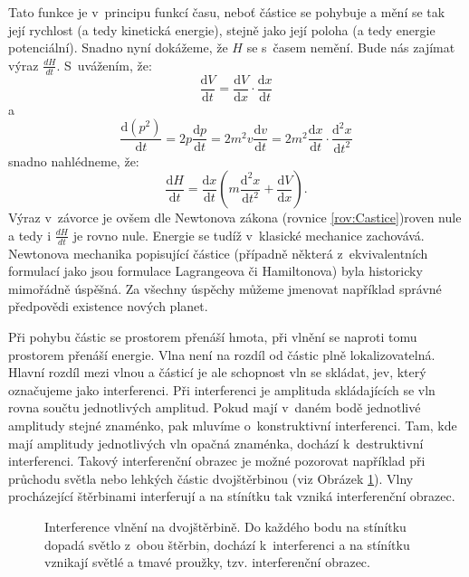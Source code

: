 Tato funkce je v~principu funkcí času, neboť částice se pohybuje a mění se tak její rychlost (a tedy kinetická energie), stejně jako její poloha (a tedy energie potenciální). Snadno nyní dokážeme, že $H$ se s~časem nemění. Bude nás zajímat výraz $\frac {dH}{dt}$. S~uvážením, že:
\begin{equation}
\frac{\mathrm{d}V}{\mathrm{d}t} = \frac{\mathrm{d}V}{\mathrm{d}x}\cdot \frac{\mathrm{d}x}{\mathrm{d}t}\mbox{}
\label{rov:Castice2}
\end{equation}
a
\begin{equation}
\frac{\mathrm{d} (p^2)}{\mathrm{d}t}=2p\frac{\mathrm{d}p}{\mathrm{d}t}=2m^2v\frac{\mathrm{d}v}{\mathrm{d}t}=2m^2\frac{\mathrm{d}x}{\mathrm{d}t}\cdot\frac{\mathrm{d}^2x}{\mathrm{d}t^2}\mbox{}
\label{rov:Castice3}
\end{equation}
snadno nahlédneme, že:
\begin{equation}
\frac{\mathrm{d}H}{\mathrm{d}t}=\frac{\mathrm{d}x}{\mathrm{d}t}\left ( m\frac{\mathrm{d}^2x}{\mathrm{d}t^2}+\frac{\mathrm{d}V}{\mathrm{d}x}\right )\mbox{.}
\label{rov:Castice4}
\end{equation}
Výraz v~závorce je ovšem dle Newtonova zákona (rovnice \ref{rov:Castice})roven nule a tedy i $\frac{dH}{dt}$ je rovno nule. Energie se tudíž v~klasické mechanice zachovává.
Newtonova mechanika popisující částice (případně některá z~ekvivalentních formulací jako jsou formulace Lagrangeova či Hamiltonova) byla historicky mimořádně úspěšná. Za všechny úspěchy můžeme jmenovat například správné předpovědi existence nových planet. 

Při pohybu částic se prostorem přenáší hmota, při vlnění se naproti tomu prostorem přenáší energie. Vlna není na rozdíl od částic plně lokalizovatelná. Hlavní rozdíl mezi vlnou a částicí je ale schopnost vln se skládat, jev, který označujeme jako interferenci. Při interferenci je amplituda skládajících se vln rovna součtu jednotlivých amplitud. Pokud mají v~daném bodě jednotlivé amplitudy stejné znaménko, pak mluvíme o~konstruktivní interferenci. Tam, kde mají amplitudy jednotlivých vln opačná znaménka, dochází k~destruktivní interferenci. Takový interferenční obrazec je možné pozorovat například při průchodu světla nebo lehkých částic dvojštěrbinou (viz Obrázek \ref{obr:Interference}). Vlny procházející štěrbinami interferují a na stínítku tak vzniká interferenční obrazec. 

\begin{figure} [ht]
\centering
\caption[Komplexní rovina]{Interference vlnění na dvojštěrbině. Do každého bodu na stínítku dopadá světlo z~obou štěrbin, dochází k~interferenci a na stínítku vznikají světlé a tmavé proužky, tzv. interferenční obrazec.}
\label{obr:Interference}
\end{figure}

